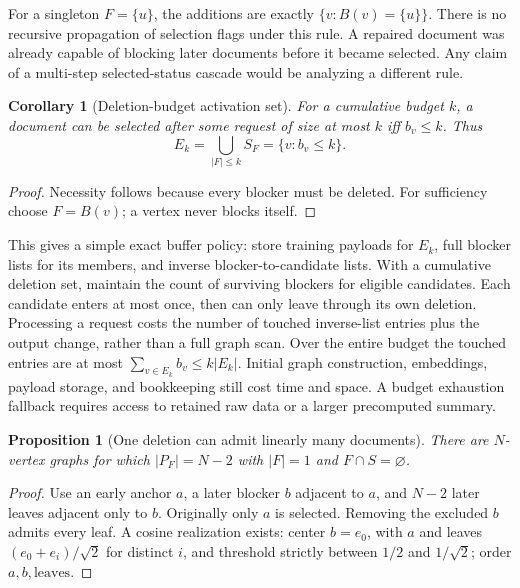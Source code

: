 \documentclass[11pt,a4paper]{article}
\newtheorem{proposition}[theorem]{Proposition}
\newtheorem{corollary}[theorem]{Corollary}
\theoremstyle{definition}\newtheorem{definition}[theorem]{Definition}
\begin{document}
For a singleton $F=\{u\}$, the additions are exactly $\{v:B(v)=\{u\}\}$. There is no recursive propagation of selection flags under this rule. A repaired document was already capable of blocking later documents before it became selected. Any claim of a multi-step selected-status cascade would be analyzing a different rule.

\begin{corollary}[Deletion-budget activation set]\label{cor:eligible}
For a cumulative budget $k$, a document can be selected after some request of size at most $k$ iff $b_v\le k$. Thus
\[
 E_k=\bigcup_{|F|\le k} S_F=\{v:b_v\le k\}.
\]
\end{corollary}
\begin{proof}
Necessity follows because every blocker must be deleted. For sufficiency choose $F=B(v)$; a vertex never blocks itself.
\end{proof}

This gives a simple exact buffer policy: store training payloads for $E_k$, full blocker lists for its members, and inverse blocker-to-candidate lists. With a cumulative deletion set, maintain the count of surviving blockers for eligible candidates. Each candidate enters at most once, then can only leave through its own deletion. Processing a request costs the number of touched inverse-list entries plus the output change, rather than a full graph scan. Over the entire budget the touched entries are at most $\sum_{v\in E_k}b_v\le k|E_k|$. Initial graph construction, embeddings, payload storage, and bookkeeping still cost time and space. A budget exhaustion fallback requires access to retained raw data or a larger precomputed summary.

\begin{proposition}[One deletion can admit linearly many documents]
There are $N$-vertex graphs for which $|P_F|=N-2$ with $|F|=1$ and $F\cap S=\varnothing$.
\end{proposition}
\begin{proof}
Use an early anchor $a$, a later blocker $b$ adjacent to $a$, and $N-2$ later leaves adjacent only to $b$. Originally only $a$ is selected. Removing the excluded $b$ admits every leaf. A cosine realization exists: center $b=e_0$, with $a$ and leaves $(e_0+e_i)/\sqrt2$ for distinct $i$, and threshold strictly between $1/2$ and $1/\sqrt2$; order $a,b,\text{leaves}$.
\end{proof}
\end{document}
